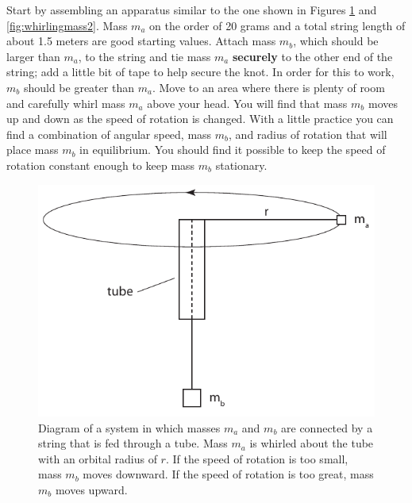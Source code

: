 \documentclass[11pt,letterpaper]{article}
\begin{document}
Start by assembling an apparatus similar to the one shown in Figures \ref{fig:whirlingmass} and \ref{fig:whirlingmass2}. Mass $m_a$ on the order of 20 grams and a total string length of about 1.5 meters are good starting values. Attach mass $m_b$, which should be larger than $m_a$, to the string and tie mass $m_a$ {\bf securely} to the other end of the string; add a little bit of tape to help secure the knot.  In order for this to work, $m_b$ should be greater than $m_a$. Move to an area where there is plenty of room and carefully whirl mass $m_a$ above your head.  You will find that mass $m_b$ moves up and down as the speed of rotation is changed.  With a little practice you can find a combination of angular speed, mass $m_b$, and radius of rotation that will place mass $m_b$ in equilibrium.  You should find it possible to keep the speed of rotation constant enough to keep mass $m_b$ stationary.

\begin{figure}[h]
\begin{center}
\includegraphics[scale=0.8]{./whirlingmass}
\end{center}
\caption{Diagram of a system in which masses $m_a$ and $m_b$ are connected by a string that is fed through a tube. Mass $m_a$ is whirled about the tube with an orbital radius of $r$. If the speed of rotation is too small, mass $m_b$ moves downward.  If the speed of rotation is too great, mass $m_b$ moves upward. %
}
\label{fig:whirlingmass}
\end{figure}
\end{document}
